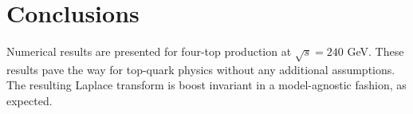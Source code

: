 \section{Conclusions}\label{sec:conclusions}

Numerical results are presented for four-top production at $\sqrt{s} =
240$ GeV. These results pave the way for top-quark physics without any
additional assumptions. The resulting Laplace transform is boost
invariant in a model-agnostic fashion, as expected.

